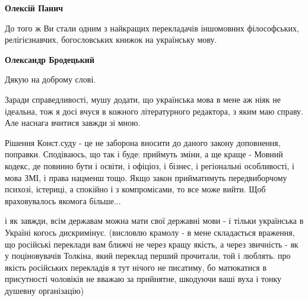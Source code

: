 \begin{itemize}
\begin{itemize}
\textbf{Олексій Панич} 

До того ж Ви стали одним з найкращих перекладачів іншомовних філософських,
релігієзнавчих, богословських книжок на українську мову.



\textbf{Олександр Бродецький} 

Дякую на доброму слові. \Smiley[1.0][yellow]

Заради справедливості, мушу додати, що українська мова в мене аж ніяк не
ідеальна, тож я досі вчуся в кожного літературного редактора, з яким маю
справу. Але наснага вчитися завжди зі мною.

\end{itemize}

 

Рішення Конст.суду - це не заборона вносити до даного закону доповнення,
поправки. Сподіваюсь, що так і буде: приймуть зміни, а ще краще - Мовний
кодекс, де повинно бути і освіти, і офіціоз, і бізнес, і регіональні
особливості, і мова ЗМІ, і права нацменш тощо. Якщо закон прийматимуть
передвиборчому психозі, істериці, а спокійно і з компромісами, то все може
вийти. Щоб враховувалось якомога більше...  

 

і як завжди, всім державам можна мати свої державні мови - і тільки українська
в Україні когось дискримінує. (висловлю крамолу - в мене складається враження,
що російські переклади вам ближчі не через кращу якість, а через звичність -
як у поціновувачів Толкіна, який переклад перший прочитали, той і люблять. про
якість російських перекладів я тут нічого не писатиму, бо матюкатися в
присутності чоловіків не вважаю за прийнятне, шкодуючи ваші вуха і тонку
душевну організацію)

\begin{itemize}
 

\end{itemize}
\end{itemize}
